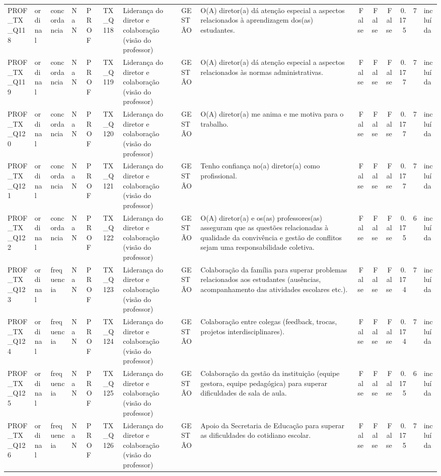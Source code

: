 \begin{tabular}{lllllllllrrrrrl}
PROF\_TX\_Q118 & ordinal & concordancia & NaN & PROF & TX\_Q118 & Liderança do diretor e colaboração (visão do professor) & GESTÃO & O(A) diretor(a) dá atenção especial a aspectos relacionados à aprendizagem dos(as) estudantes. & False & False & False & 0.175 & 7 & incluída \\
PROF\_TX\_Q119 & ordinal & concordancia & NaN & PROF & TX\_Q119 & Liderança do diretor e colaboração (visão do professor) & GESTÃO & O(A) diretor(a) dá atenção especial a aspectos relacionados às normas administrativas. & False & False & False & 0.177 & 7 & incluída \\
PROF\_TX\_Q120 & ordinal & concordancia & NaN & PROF & TX\_Q120 & Liderança do diretor e colaboração (visão do professor) & GESTÃO & O(A) diretor(a) me anima e me motiva para o trabalho. & False & False & False & 0.177 & 7 & incluída \\
PROF\_TX\_Q121 & ordinal & concordancia & NaN & PROF & TX\_Q121 & Liderança do diretor e colaboração (visão do professor) & GESTÃO & Tenho confiança no(a) diretor(a) como profissional. & False & False & False & 0.177 & 7 & incluída \\
PROF\_TX\_Q122 & ordinal & concordancia & NaN & PROF & TX\_Q122 & Liderança do diretor e colaboração (visão do professor) & GESTÃO & O(A) diretor(a) e os(as) professores(as) asseguram que as questões relacionadas à qualidade da convivência e gestão de conflitos sejam uma responsabilidade coletiva. & False & False & False & 0.175 & 6 & incluída \\
PROF\_TX\_Q123 & ordinal & frequencia & NaN & PROF & TX\_Q123 & Liderança do diretor e colaboração (visão do professor) & GESTÃO & Colaboração da família para superar problemas relacionados aos estudantes (ausências, acompanhamento das atividades escolares etc.). & False & False & False & 0.174 & 7 & incluída \\
PROF\_TX\_Q124 & ordinal & frequencia & NaN & PROF & TX\_Q124 & Liderança do diretor e colaboração (visão do professor) & GESTÃO & Colaboração entre colegas (feedback, trocas, projetos interdisciplinares). & False & False & False & 0.174 & 7 & incluída \\
PROF\_TX\_Q125 & ordinal & frequencia & NaN & PROF & TX\_Q125 & Liderança do diretor e colaboração (visão do professor) & GESTÃO & Colaboração da gestão da instituição (equipe gestora, equipe pedagógica) para superar dificuldades de sala de aula. & False & False & False & 0.175 & 6 & incluída \\
PROF\_TX\_Q126 & ordinal & frequencia & NaN & PROF & TX\_Q126 & Liderança do diretor e colaboração (visão do professor) & GESTÃO & Apoio da Secretaria de Educação para superar as dificuldades do cotidiano escolar. & False & False & False & 0.175 & 7 & incluída \\

\end{tabular}
